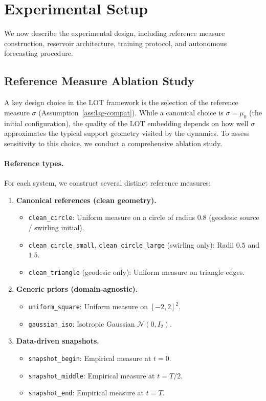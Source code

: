 \documentclass[11pt]{article}
\newcommand{\1}{\mathbf{1}}
\begin{document}
\section{Experimental Setup}
\label{sec:setup}

We now describe the experimental design, including reference measure construction, reservoir architecture, training protocol, and autonomous forecasting procedure.

\subsection{Reference Measure Ablation Study}\label{sec:ref-ablation}

A key design choice in the LOT framework is the selection of the reference measure $\sigma$ (Assumption~\ref{ass:lag-compat}). While a canonical choice is $\sigma = \mu_0$ (the initial configuration), the quality of the LOT embedding depends on how well $\sigma$ approximates the typical support geometry visited by the dynamics. To assess sensitivity to this choice, we conduct a comprehensive ablation study.

\paragraph{Reference types.}
For each system, we construct several distinct reference measures:

\begin{enumerate}
\item \textbf{Canonical references (clean geometry).}
\begin{itemize}
\item \texttt{clean\_circle}: Uniform measure on a circle of radius $0.8$ (geodesic source / swirling initial).
\item \texttt{clean\_circle\_small}, \texttt{clean\_circle\_large} (swirling only): Radii $0.5$ and $1.5$.
\item \texttt{clean\_triangle} (geodesic only): Uniform measure on triangle edges.
\end{itemize}

\item \textbf{Generic priors (domain-agnostic).}
\begin{itemize}
\item \texttt{uniform\_square}: Uniform measure on $[-2,2]^2$.
\item \texttt{gaussian\_iso}: Isotropic Gaussian $\mathcal{N}(0, I_2)$.
\end{itemize}

\item \textbf{Data-driven snapshots.}
\begin{itemize}
\item \texttt{snapshot\_begin}: Empirical measure at $t = 0$.
\item \texttt{snapshot\_middle}: Empirical measure at $t = T/2$.
\item \texttt{snapshot\_end}: Empirical measure at $t = T$.
\end{itemize}
\end{enumerate}
\end{document}
